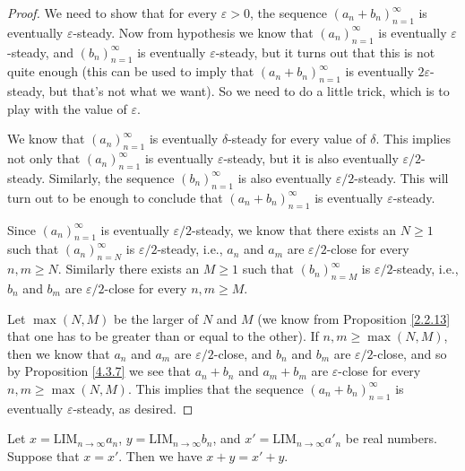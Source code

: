 \begin{proof}
We need to show that for every \(\varepsilon > 0\), the sequence \((a_n + b_n)_{n = 1}^{\infty}\) is eventually \(\varepsilon\)-steady.
Now from hypothesis we know that \((a_n)_{n = 1}^{\infty}\) is eventually \(\varepsilon\)-steady, and \((b_n)_{n = 1}^{\infty}\) is eventually \(\varepsilon\)-steady, but it turns out that this is not quite enough
(this can be used to imply that \((a_n + b_n)_{n = 1}^{\infty}\) is eventually \(2\varepsilon\)-steady, but that's not what we want).
So we need to do a little trick, which is to play with the value of \(\varepsilon\).

We know that \((a_n)_{n = 1}^{\infty}\) is eventually \(\delta\)-steady for every value of \(\delta\).
This implies not only that \((a_n)_{n = 1}^{\infty}\) is eventually \(\varepsilon\)-steady, but it is also eventually \(\varepsilon / 2\)-steady.
Similarly, the sequence \((b_n)_{n = 1}^{\infty}\) is also eventually \(\varepsilon / 2\)-steady.
This will turn out to be enough to conclude that \((a_n + b_n)_{n = 1}^{\infty}\) is eventually \(\varepsilon\)-steady.

Since \((a_n)_{n = 1}^{\infty}\) is eventually \(\varepsilon / 2\)-steady, we know that there exists an \(N \geq 1\) such that \((a_n)_{n = N}^{\infty}\) is \(\varepsilon / 2\)-steady, i.e., \(a_n\) and \(a_m\) are \(\varepsilon / 2\)-close for every \(n, m \geq N\).
Similarly there exists an \(M \geq 1\) such that \((b_n)_{n = M}^{\infty}\) is \(\varepsilon / 2\)-steady, i.e., \(b_n\) and \(b_m\) are \(\varepsilon / 2\)-close for every \(n, m \geq M\).

Let \(\max(N, M)\) be the larger of \(N\) and \(M\)
(we know from Proposition \ref{2.2.13} that one has to be greater than or equal to the other).
If \(n, m \geq \max(N, M)\), then we know that \(a_n\) and \(a_m\) are \(\varepsilon / 2\)-close, and \(b_n\) and \(b_m\) are \(\varepsilon / 2\)-close, and so by Proposition \ref{4.3.7} we see that \(a_n + b_n\) and \(a_m + b_m\) are \(\varepsilon\)-close for every \(n, m \geq \max(N, M)\).
This implies that the sequence \((a_n + b_n)_{n = 1}^{\infty}\) is eventually \(\varepsilon\)-steady, as desired.
\end{proof}

\begin{lemma}\label{5.3.7}
Let \(x = \text{LIM}_{n \to \infty} a_n\), \(y = \text{LIM}_{n \to \infty} b_n\), and \(x' = \text{LIM}_{n \to \infty} a'_n\) be real numbers.
Suppose that \(x = x'\).
Then we have \(x + y = x' + y\).
\end{lemma}

